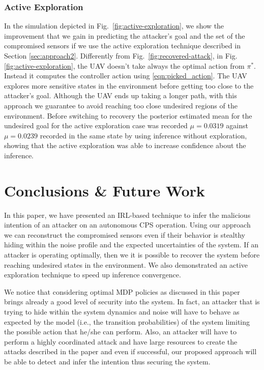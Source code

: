 \documentclass[letterpaper, 10 pt, conference]{ieeeconf}  %
\begin{document}
\subsubsection{Active Exploration}
In the simulation depicted in Fig.~\ref{fig:active-exploration}, we show the improvement that we gain in predicting the attacker's goal and the set of the compromised sensors if we use the active exploration technique described in Section \ref{sec:approach2}. Differently from Fig.~\ref{fig:recovered-attack}, in Fig. \ref{fig:active-exploration}, the UAV doesn't take always the optimal action from $\pi^*$. Instead it computes the controller action using \eqref{eqn:picked_action}. The UAV explores more sensitive states in the environment before getting too close to the attacker's goal. Although the UAV ends up taking a longer path, with this approach we guarantee to avoid reaching too close undesired regions of the environment. Before switching to recovery the posterior estimated mean for the undesired goal for the active exploration case was recorded $\mu=0.0319$ against $\mu=0.0239$ recorded in the same state by using inference without exploration, showing that the active exploration was able to increase confidence about the inference.

\section{Conclusions \& Future Work}\label{sec:conclusion}
In this paper, we have presented an IRL-based technique to infer the malicious intention of an attacker on an autonomous CPS operation. Using our approach we can reconstruct the compromised sensors even if their behavior is stealthy hiding within the noise profile and the expected uncertainties of the system. If an attacker is operating optimally, then we it is possible to recover the system before reaching undesired states in the environment. We also demonstrated an active exploration technique to speed up inference convergence.

We notice that considering optimal MDP policies as discussed in this paper brings already a good level of security into the system. In fact, an attacker that is trying to hide within the system dynamics and noise will have to behave as expected by the model (i.e., the transition probabilities) of the system limiting the possible action that he/she can perform. Also, an attacker will have to perform a highly coordinated attack and have large resources to create the attacks described in the paper and even if successful, our proposed approach will be able to detect and infer the intention thus securing the system.
\end{document}
